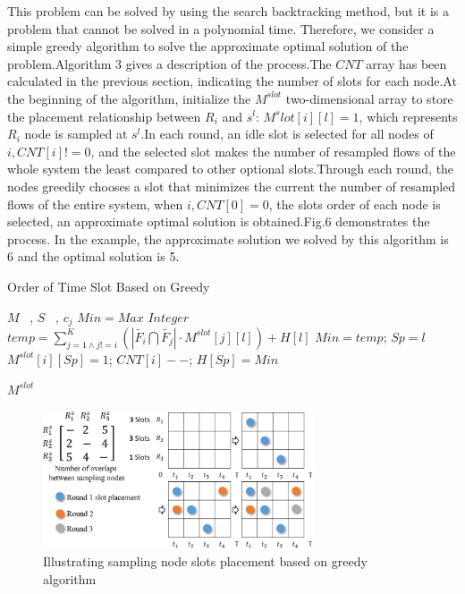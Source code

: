 \documentclass[conference,compsoc]{IEEEtran}
\begin{document}
This problem can be solved by using the search backtracking method, but it is a problem that cannot be solved in a polynomial time. Therefore, we consider a simple greedy algorithm to solve the approximate optimal solution of the problem.Algorithm 3 gives a description of the process.The $CNT$ array has been calculated in the previous section, indicating the number of slots for each node.At the beginning of the algorithm, initialize the $M^{slot}$ two-dimensional array to store the placement relationship between $R_i$ and $s^l$: $M^slot[i][l] = 1$, which represents $R_i$ node is sampled at $s^l$.In each round, an idle slot is selected for all nodes of $i, CNT[i]!=0$, and the selected slot makes the number of resampled flows of the whole system the least compared to other optional slots.Through each round, the nodes greedily chooses a slot that minimizes the current the number of resampled flows of the entire system, when $i, CNT[0]=0$, the slots order of each node is selected, an approximate optimal solution is obtained.Fig.6 demonstrates the process. In the example, the approximate solution we solved by this algorithm is 6 and the optimal solution is 5.
\begin{algorithm}[h]
\caption{Order of Time Slot Based on Greedy}
\begin{algorithmic}[1]
\REQUIRE  $M$ ~, $S$ ~, $c_j$
\STATE $Min = Max$ $Integer$
\STATE $temp = \sum^{K}_{j=1 \wedge j != i}(\left| \widetilde{{{F}_{i}}}\bigcap \widetilde{{{F}_{j}}} \right| \cdot M^{slot}[j][l]) + H[l] $
\STATE $Min = temp$; $Sp = l$ 
\ENDIF
\ENDIF
\ENDFOR
\STATE$M^{slot}[i][Sp] = 1$; $ CNT[i]--$; $H[Sp] = Min$
\ENDIF
\ENDFOR
\ENDWHILE

\RETURN $M^{slot}$
\label{code:recentEnd}
\end{algorithmic}
\end{algorithm}

\begin{figure}[!hhhhhhhhhht]
\centering
\includegraphics[width=8cm]{images/greedy_for_order_slot.png}
\caption{Illustrating sampling node slots placement based on greedy algorithm}
\label{slot_order}
\end{figure}
\end{document}
